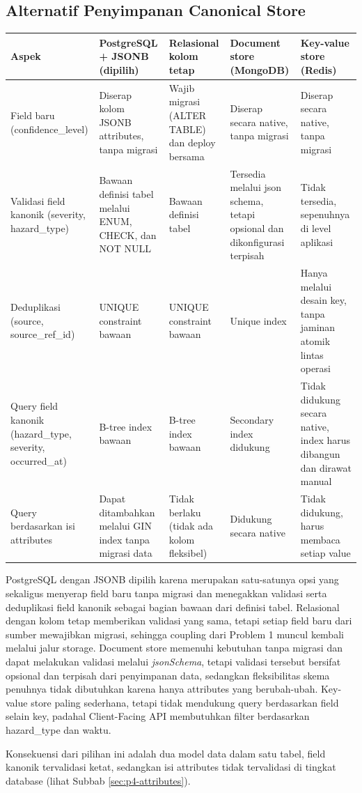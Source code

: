 \subsection{Alternatif Penyimpanan Canonical Store}

\begin{longtable}[]{|>{\raggedright\arraybackslash}p{\dimexpr(\linewidth-10\tabcolsep)/5\relax}|>{\raggedright\arraybackslash}p{\dimexpr(\linewidth-10\tabcolsep)/5\relax}|>{\raggedright\arraybackslash}p{\dimexpr(\linewidth-10\tabcolsep)/5\relax}|>{\raggedright\arraybackslash}p{\dimexpr(\linewidth-10\tabcolsep)/5\relax}|>{\raggedright\arraybackslash}p{\dimexpr(\linewidth-10\tabcolsep)/5\relax}|}
\hline
Aspek & PostgreSQL + JSONB (dipilih) & Relasional kolom tetap & Document store (MongoDB) & Key-value store (Redis) \\
\hline
\endhead
\endlastfoot
Field baru (confidence\_level) & Diserap kolom JSONB attributes, tanpa migrasi & Wajib migrasi (ALTER TABLE) dan deploy bersama & Diserap secara native, tanpa migrasi & Diserap secara native, tanpa migrasi \\
\hline
Validasi field kanonik (severity, hazard\_type) & Bawaan definisi tabel melalui ENUM, CHECK, dan NOT NULL & Bawaan definisi tabel & Tersedia melalui json schema, tetapi opsional dan dikonfigurasi terpisah & Tidak tersedia, sepenuhnya di level aplikasi \\
\hline
Deduplikasi (source, source\_ref\_id) & UNIQUE constraint bawaan & UNIQUE constraint bawaan & Unique index & Hanya melalui desain key, tanpa jaminan atomik lintas operasi \\
\hline
Query field kanonik (hazard\_type, severity, occurred\_at) & B-tree index bawaan & B-tree index bawaan & Secondary index didukung & Tidak didukung secara native, index harus dibangun dan dirawat manual \\
\hline
Query berdasarkan isi attributes & Dapat ditambahkan melalui GIN index tanpa migrasi data & Tidak berlaku (tidak ada kolom fleksibel) & Didukung secara native & Tidak didukung, harus membaca setiap value \\
\hline
\end{longtable}

PostgreSQL dengan JSONB dipilih karena merupakan satu-satunya opsi yang sekaligus menyerap field baru tanpa migrasi dan menegakkan validasi serta deduplikasi field kanonik sebagai bagian bawaan dari definisi tabel. Relasional dengan kolom tetap memberikan validasi yang sama, tetapi setiap field baru dari sumber mewajibkan migrasi, sehingga coupling dari Problem 1 muncul kembali melalui jalur storage. Document store memenuhi kebutuhan tanpa migrasi dan dapat melakukan validasi melalui \emph{jsonSchema}, tetapi validasi tersebut bersifat opsional dan terpisah dari penyimpanan data, sedangkan fleksibilitas skema penuhnya tidak dibutuhkan karena hanya attributes yang berubah-ubah. Key-value store paling sederhana, tetapi tidak mendukung query berdasarkan field selain key, padahal Client-Facing API membutuhkan filter berdasarkan hazard\_type dan waktu.

Konsekuensi dari pilihan ini adalah dua model data dalam satu tabel, field kanonik tervalidasi ketat, sedangkan isi attributes tidak tervalidasi di tingkat database (lihat Subbab \ref{sec:p4-attributes}).
